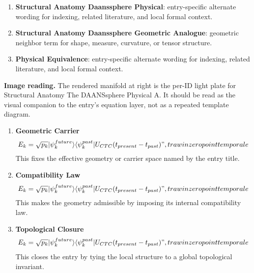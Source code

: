 \begin{enumerate}[leftmargin=1.6em,itemsep=6pt,topsep=4pt]
\item \textbf{Structural Anatomy Daanssphere Physical}: entry-specific alternate wording for indexing, related literature, and local formal context.
\item \textbf{Structural Anatomy Daanssphere Geometric Analogue}: geometric neighbor term for shape, measure, curvature, or tensor structure.
\item \textbf{Physical Equivalence}: entry-specific alternate wording for indexing, related literature, and local formal context.
\end{enumerate}

\begin{samepage}
\noindent\begin{minipage}[t]{0.45\linewidth}
\vspace{0pt}
\raggedright
\scriptsize\textbf{Image reading.} The rendered manifold at right is the per-ID light plate for Structural Anatomy The DAANSsphere Physical A. It should be read as the visual companion to the entry's equation layer, not as a repeated template diagram.\par
\end{minipage}\hfill
\begin{minipage}[t]{0.53\linewidth}
\vspace*{-0.10in}
\raggedright
{}
\end{minipage}
\end{samepage}

\clearpage


\begin{enumerate}[leftmargin=1.6em,itemsep=9pt,topsep=6pt]
\item \textbf{Geometric Carrier}
\[
E_k = \sqrt{p_k} |\psi_k^{future}\rangle \langle \psi_k^{past}| U_{CTC}(t_{present} - t_{past})",trawin zero point temporal e
\]
This fixes the effective geometry or carrier space named by the entry title.

\item \textbf{Compatibility Law}
\[
E_k = \sqrt{p_k} |\psi_k^{future}\rangle \langle \psi_k^{past}| U_{CTC}(t_{present} - t_{past})",trawin zero point temporal e
\]
This makes the geometry admissible by imposing its internal compatibility law.

\item \textbf{Topological Closure}
\[
E_k = \sqrt{p_k} |\psi_k^{future}\rangle \langle \psi_k^{past}| U_{CTC}(t_{present} - t_{past})",trawin zero point temporal e
\]
This closes the entry by tying the local structure to a global topological invariant.
\end{enumerate}

